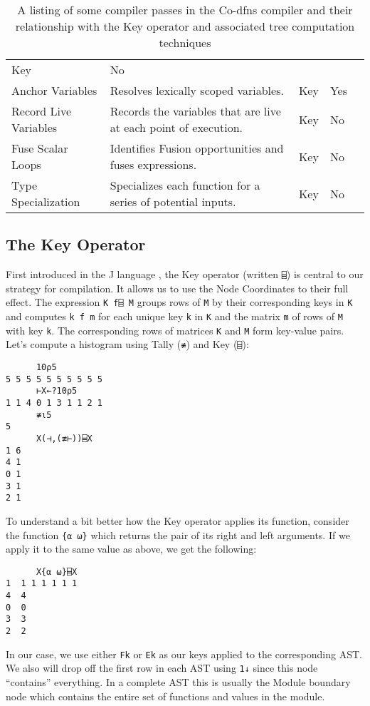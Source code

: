 \documentclass[numbers,preprint]{sigplanconf}
\begin{document}
\begin{table*}
\begin{tabular}{l p{2.8in} l l l}
 Key & No \\
Anchor Variables & Resolves lexically scoped variables. &
 Key & Yes \\
Record Live Variables & Records the variables that are live at each point of 
 execution. & Key & No \\
Fuse Scalar Loops & Identifies Fusion opportunities and fuses expressions. &
 Key & No \\
Type Specialization & Specializes each function for a series of potential inputs. 
 & Key & No \\
\end{tabular}
\caption{A listing of some compiler passes in the Co-dfns compiler and their 
 relationship with the Key operator and associated tree computation techniques}
\label{tab:passes}
\end{table*}

\subsection{The Key Operator}

First introduced in the J language \cite{hui2014key},
the Key operator (written \verb;⌸;) is central to our strategy for compilation.
It allows us to use the Node Coordinates to their full effect. 
The expression \verb;K f⌸ M; groups rows of \verb;M; by their corresponding 
keys in \verb;K; and computes \verb;k f m; for each unique key \verb;k; in 
\verb;K; and the matrix \verb;m; of rows of \verb;M; with key \verb;k;. 
The corresponding rows of matrices \verb;K; and \verb;M; form key-value pairs.
Let's compute a histogram using Tally (\verb;≢;) and Key (\verb;⌸;):

\begin{verbatim}
      10⍴5
5 5 5 5 5 5 5 5 5 5
      ⊢X←?10⍴5
1 1 4 0 1 3 1 1 2 1
      ≢⍳5
5
      X(⊣,(≢⊢))⌸X
1 6
4 1
0 1
3 1
2 1
\end{verbatim}

\noindent
To understand a bit better how the Key operator applies its function,
consider the function \verb;{⍺ ⍵}; which returns the pair of its right
and left arguments. If we apply it to the same value as above, we
get the following:

\begin{verbatim}
      X{⍺ ⍵}⌸X
1  1 1 1 1 1 1 
4  4           
0  0           
3  3           
2  2
\end{verbatim}

\noindent
In our case, we use either \verb;Fk; or \verb;Ek; as our keys applied to the
corresponding AST. We also will drop off the first row in each AST
using \verb;1↓; since this node ``contains'' everything. In a complete
AST this is usually the Module boundary node which contains the entire
set of functions and values in the module.
\end{document}
